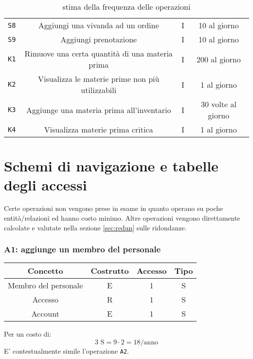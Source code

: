 \documentclass[a4paper,12pt]{report}
\begin{document}
\begin{table}[H]
\begin{center}
\begin{tabular}{||c | c | c | c ||}
    \texttt{S8} & Aggiungi una vivanda ad un ordine & I & 10 al giorno\\
    \texttt{S9} & Aggiungi prenotazione & I & 10 al giorno\\
    \texttt{K1} & Rimuove una certa quantità di una materia prima & I & 200 al giorno\\
    \texttt{K2} & Visualizza le materie prime non più utilizzabili & I & 1 al giorno\\
    \texttt{K3} & Aggiunge una materia prima all’inventario & I & 30 volte al giorno\\
    \texttt{K4} & Visualizza materie prima critica & I & 1 al giorno\\
    \hline
\end{tabular}
\end{center}
\caption{stima della frequenza delle operazioni}
\label{table:stima-frequenze}
\end{table}

\section{Schemi di navigazione e tabelle degli accessi}
Certe operazioni non vengono prese in esame in quanto operano su poche entità/relazioni ed hanno costo minimo. Altre operazioni vengono direttamente calcolate e valutate nella sezione \ref{sec:redun} sulle ridondanze.
\subsubsection{A1: aggiunge un membro del personale}
\begin{table}[H]
    \centering
    \begin{tabular}{|| c | c | c | c ||}
        \hline
        Concetto & Costrutto & Accesso & Tipo\\
        \hline
        Membro del personale & E & 1 & S\\
        \hline
        Accesso & R & 1 & S\\
        \hline
        Account & E & 1 & S\\
        \hline
    \end{tabular}
\end{table}
%
Per un costo di:
%
\begin{equation}
    3\text{ S}=  9 \cdot 2 = 18\text{/anno}
\end{equation}
E' contestualmente simile l'operazione \texttt{A2}.
\end{document}
